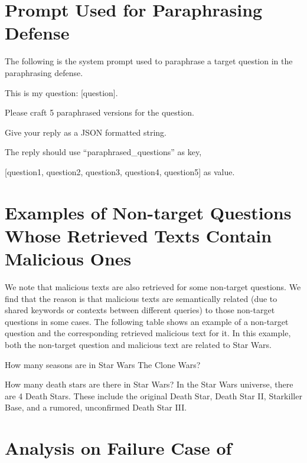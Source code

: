 \section{Prompt Used for Paraphrasing Defense}
\label{prompt-paraphrase-defense}
The following is the system prompt used to paraphrase a target question in the paraphrasing defense.

\begin{tcolorbox}
This is my question: [question]. 

Please craft 5 paraphrased versions for the question. 

Give your reply as a JSON formatted string.

The reply should use ``paraphrased\_questions'' as key,

[question1, question2, question3, question4, question5] as value.
\end{tcolorbox}


\section{Examples of Non-target Questions Whose Retrieved Texts Contain Malicious Ones}
\label{appendix-sec-example-nontarget-question}
We note that malicious texts are also retrieved for some non-target questions. We find that the reason is that malicious texts are semantically related (due to shared keywords or contexts between different queries) to those non-target questions in some cases. The following table shows an example of a non-target question and the corresponding retrieved malicious text for it. In this example, both the non-target question and malicious text are related to Star Wars. 
\begin{tcolorbox}

 How many seasons are in Star Wars The Clone Wars?

 How many death stars are there in Star Wars? In the Star Wars universe, there are 4 Death Stars. These include the original Death Star, Death Star II, Starkiller Base, and a rumored, unconfirmed Death Star III.

\end{tcolorbox}

\section{Analysis on Failure Case of {\name}}
\label{failure-case-analysis}


